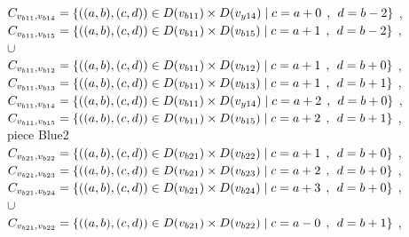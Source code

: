 \\$C_{v_{b11},v_{b14}}=\{((a,b),(c,d))\in D(v_{b11}) \times D(v_{y14})\mid c = a + 0\hspace{1ex} , \hspace{1ex}  d = b - 2 \}$ , 
\\$C_{v_{b11},v_{b15}}=\{((a,b),(c,d))\in D(v_{b11}) \times D(v_{b15})\mid c = a + 1\hspace{1ex} , \hspace{1ex}  d = b - 2 \}$ , 
\\$\cup$
\\$C_{v_{b11},v_{b12}}=\{((a,b),(c,d))\in D(v_{b11}) \times D(v_{b12})\mid c = a + 1\hspace{1ex} , \hspace{1ex}  d = b + 0 \}$ , 
\\$C_{v_{b11},v_{b13}}=\{((a,b),(c,d))\in D(v_{b11}) \times D(v_{b13})\mid c = a + 1\hspace{1ex} , \hspace{1ex}  d = b + 1 \}$ , 
\\$C_{v_{b11},v_{b14}}=\{((a,b),(c,d))\in D(v_{b11}) \times D(v_{y14})\mid c = a + 2\hspace{1ex} , \hspace{1ex}  d = b + 0 \}$ , 
\\$C_{v_{b11},v_{b15}}=\{((a,b),(c,d))\in D(v_{b11}) \times D(v_{b15})\mid c = a + 2\hspace{1ex} , \hspace{1ex}  d = b + 1 \}$ , 
\\ piece Blue2 
\\$C_{v_{b21},v_{b22}}=\{((a,b),(c,d))\in D(v_{b21}) \times D(v_{b22})\mid c = a + 1\hspace{1ex} , \hspace{1ex}  d = b + 0 \}$ , 
\\$C_{v_{b21},v_{b23}}=\{((a,b),(c,d))\in D(v_{b21}) \times D(v_{b23})\mid c = a + 2\hspace{1ex} , \hspace{1ex}  d = b + 0 \}$ , 
\\$C_{v_{b21},v_{b24}}=\{((a,b),(c,d))\in D(v_{b21}) \times D(v_{b24})\mid c = a + 3\hspace{1ex} , \hspace{1ex}  d = b + 0 \}$ , 
\\$\cup$
\\$C_{v_{b21},v_{b22}}=\{((a,b),(c,d))\in D(v_{b21}) \times D(v_{b22})\mid c = a - 0\hspace{1ex} , \hspace{1ex}  d = b + 1 \}$ , 
